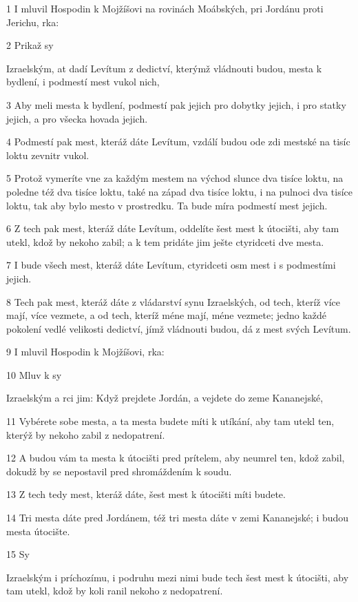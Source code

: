 \par 1 I mluvil Hospodin k Mojžíšovi na rovinách Moábských, pri Jordánu proti Jerichu, rka:
\par 2 Prikaž sy\par Izraelským, at dadí Levítum z dedictví, kterýmž vládnouti budou, mesta k bydlení, i podmestí mest vukol nich,
\par 3 Aby meli mesta k bydlení, podmestí pak jejich pro dobytky jejich, i pro statky jejich, a pro všecka hovada jejich.
\par 4 Podmestí pak mest, kteráž dáte Levítum, vzdálí budou ode zdi mestské na tisíc loktu zevnitr vukol.
\par 5 Protož vymeríte vne za každým mestem na východ slunce dva tisíce loktu, na poledne též dva tisíce loktu, také na západ dva tisíce loktu, i na pulnoci dva tisíce loktu, tak aby bylo mesto v prostredku. Ta bude míra podmestí mest jejich.
\par 6 Z tech pak mest, kteráž dáte Levítum, oddelíte šest mest k útocišti, aby tam utekl, kdož by nekoho zabil; a k tem pridáte jim ješte ctyridceti dve mesta.
\par 7 I bude všech mest, kteráž dáte Levítum, ctyridceti osm mest i s podmestími jejich.
\par 8 Tech pak mest, kteráž dáte z vládarství synu Izraelských, od tech, kteríž více mají, více vezmete, a od tech, kteríž méne mají, méne vezmete; jedno každé pokolení vedlé velikosti dedictví, jímž vládnouti budou, dá z mest svých Levítum.
\par 9 I mluvil Hospodin k Mojžíšovi, rka:
\par 10 Mluv k sy\par Izraelským a rci jim: Když prejdete Jordán, a vejdete do zeme Kananejské,
\par 11 Vybérete sobe mesta, a ta mesta budete míti k utíkání, aby tam utekl ten, kterýž by nekoho zabil z nedopatrení.
\par 12 A budou vám ta mesta k útocišti pred prítelem, aby neumrel ten, kdož zabil, dokudž by se nepostavil pred shromáždením k soudu.
\par 13 Z tech tedy mest, kteráž dáte, šest mest k útocišti míti budete.
\par 14 Tri mesta dáte pred Jordánem, též tri mesta dáte v zemi Kananejské; i budou mesta útocište.
\par 15 Sy\par Izraelským i príchozímu, i podruhu mezi nimi bude tech šest mest k útocišti, aby tam utekl, kdož by koli ranil nekoho z nedopatrení.

